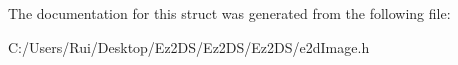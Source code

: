 The documentation for this struct was generated from the following file\-:\begin{DoxyCompactItemize}
\item 
C\-:/\-Users/\-Rui/\-Desktop/\-Ez2\-D\-S/\-Ez2\-D\-S/\-Ez2\-D\-S/e2d\-Image.\-h\end{DoxyCompactItemize}
